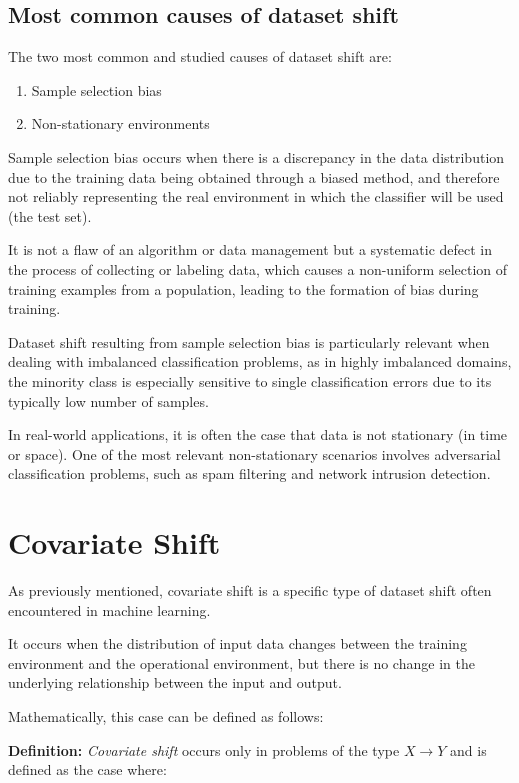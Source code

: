 	
\subsection{Most common causes of dataset shift}
	
The two most common and studied causes of dataset shift are:

\begin{enumerate}
	\item Sample selection bias
	\item Non-stationary environments
\end{enumerate}


Sample selection bias occurs when there is a discrepancy in the data distribution due to the training data being obtained through a biased method, and therefore not reliably representing the real environment in which the classifier will be used (the test set).

It is not a flaw of an algorithm or data management but a systematic defect in the process of collecting or labeling data, which causes a non-uniform selection of training examples from a population, leading to the formation of bias during training.

Dataset shift resulting from sample selection bias is particularly relevant when dealing with imbalanced classification problems, as in highly imbalanced domains, the minority class is especially sensitive to single classification errors due to its typically low number of samples.

In real-world applications, it is often the case that data is not stationary (in time or space). One of the most relevant non-stationary scenarios involves adversarial classification problems, such as spam filtering and network intrusion detection.
	

\section{Covariate Shift}

As previously mentioned, covariate shift is a specific type of dataset shift often encountered in machine learning.
	
It occurs when the distribution of input data changes between the training environment and the operational environment, but there is no change in the underlying relationship between the input and output.  
	
Mathematically, this case can be defined as follows:  
	
	\vspace{0.5cm}  
	\textbf{Definition:} \textit{Covariate shift} occurs only in problems of the type $X \to Y$ and is defined as the case where:  
	
